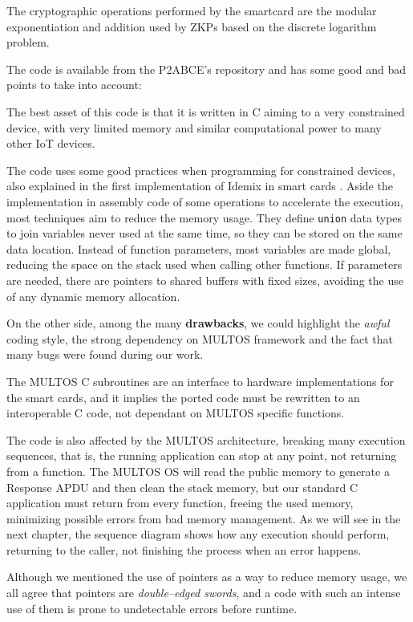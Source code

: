 The cryptographic operations performed by the smartcard are the modular exponentiation and addition used by ZKPs based on the discrete logarithm problem.

\hfil

The code is available from the P2ABCE's repository and has some good and bad points to take into account:

The best asset of this code is that it is written in C aiming to a very constrained device, with very limited memory and similar computational power to many other IoT devices.

The code uses some good practices when programming for constrained devices, also explained in the first implementation of Idemix in smart cards \citep{vullers2013efficient}. Aside the implementation in assembly code of some operations to accelerate the execution, most techniques aim to reduce the memory usage. They define \texttt{union} data types to join variables never used at the same time, so they can be stored on the same data location. Instead of function parameters, most variables are made global, reducing the space on the stack used when calling other functions. If parameters are needed, there are pointers to shared buffers with fixed sizes, avoiding the use of any dynamic memory allocation.


On the other side, among the many \textbf{drawbacks}, we could highlight the \textit{awful} coding style, the strong dependency on MULTOS framework and the fact that many bugs were found during our work.

The MULTOS C subroutines are an interface to hardware implementations for the smart cards, and it implies the ported code must be rewritten to an interoperable C code, not dependant on MULTOS specific functions.

The code is also affected by the MULTOS architecture, breaking many execution sequences, that is, the running application can stop at any point, not returning from a function. The MULTOS OS will read the public memory to generate a Response APDU and then clean the stack memory, but our standard C application must return from every function, freeing the used memory, minimizing possible errors from bad memory management. As we will see in the next chapter, the sequence diagram shows how any execution should perform, returning to the caller, not finishing the process when an error happens.

Although we mentioned the use of pointers as a way to reduce memory usage, we all agree that pointers are \textit{double–edged swords}, and a code with such an intense use of them is prone to undetectable errors before runtime.

